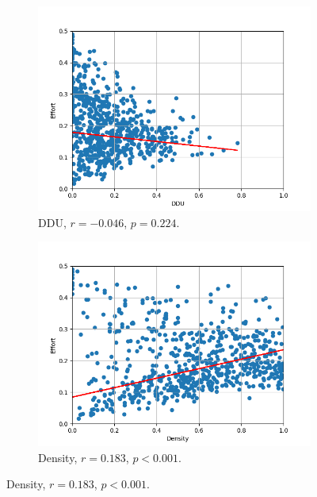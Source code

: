 \documentclass[twoside,a4paper,11pt]{memoir}
\begin{document}
\begin{figure}
    \centering
    \begin{subfigure}[b]{0.49\linewidth}
        \centering
        \includegraphics[width=\linewidth]{figures/ddu_effort_goodness_025}
        \caption{DDU, $r = -0.046$, $p = 0.224$.}
        \label{fig:ddu_effort_goodness_025}
    \end{subfigure}
    \hfill
    \begin{subfigure}[b]{0.49\linewidth}
        \centering
        \includegraphics[width=\linewidth]{figures/density_effort_goodness_025}
        \caption{Density, $r = 0.183$, $p < 0.001$.}
        \label{fig:density_effort_goodness_025}
    \end{subfigure}

\end{figure}
\end{document}
